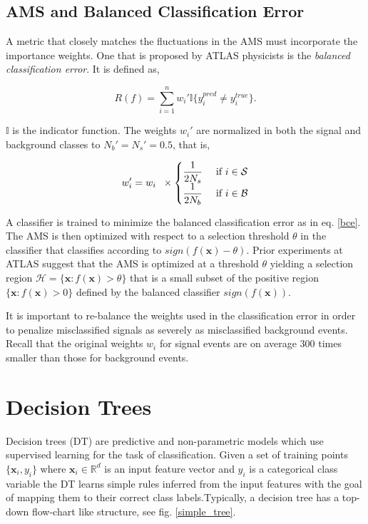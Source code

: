 \documentclass[final,3p,times,twocolumn]{elsarticle}
\begin{document}
\subsection{AMS and Balanced Classification Error}
\label{AMSbce}
A metric that closely matches the fluctuations in the AMS must incorporate the importance weights. One that is proposed by ATLAS physicists is the \textit{balanced classification error}. It is defined as, 

\begin{equation} 
R(f) = \sum_{i=1}^{n}w_{i}'\mathbb{I}\{y_{i}^{pred} \neq y_{i}^{true}\}. 
\label{bce}
\end{equation}

$\mathbb{I}$ is the indicator function. The weights $w_{i}'$ are normalized in both the signal and background classes to $N_{b}' = N_{s}' = 0.5$, that is, 

\begin{equation}
w_{i}' = w_{i}  \hspace{2mm} \times 
\begin{cases}
\dfrac{1}{2N_{s}} & \textrm{ if } i \in \mathcal{S} \\
\dfrac{1}{2N_{b}} & \textrm{ if } i \in \mathcal{B} 
\end{cases}
\end{equation}
 
A classifier is trained to minimize the balanced classification error as in eq. \ref{bce}. The AMS is then optimized with respect to a selection threshold $\theta$ in the classifier that classifies according to $sign(f(\textbf{x}) - \theta)$. Prior experiments at ATLAS suggest that the AMS is optimized at a threshold $\theta$ yielding a selection region $\mathcal{H} = \{ \textbf{x} : f(\textbf{x}) > \theta \}$ that is a small subset of the positive region $\{ \textbf{x} : f(\textbf{x}) > 0\}$ defined by the balanced classifier $sign(f(\textbf{x}))$.

It is important to re-balance the weights used in the classification error in order to penalize misclassified signals as severely as misclassified background events. Recall that the original weights $w_{i}$ for signal events are on average 300 times smaller than those for background events. %

\section{Decision Trees}
\label{DT}
Decision trees (DT) are predictive and non-parametric models which use supervised learning for the task of classification. Given a set of training points $\{\textbf{x}_{i},y_{i}\}$ where $\textbf{x}_{i} \in \mathbb{R}^d$ is an input feature vector and $y_{i}$ is a categorical class variable the DT learns simple rules inferred from the input features with the goal of mapping them to their correct class labels.Typically, a decision tree has a top-down flow-chart like structure, see fig. \ref{simple_tree}.
\end{document}
